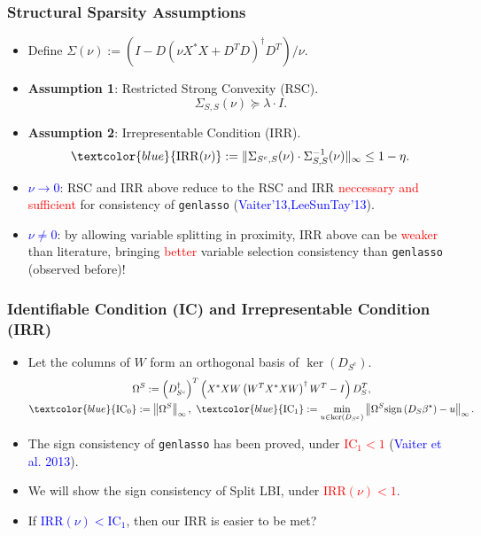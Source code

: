 \documentclass[slidestop,compress,9pt,epsfig,color]{beamer}
\theoremstyle{example}
\begin{document}
\begin{frame}
    \frametitle{Structural Sparsity Assumptions}
    \begin{itemize}
        \item
            Define $\Sigma(\nu) := (I - D (\nu X^{*} X + D^T D)^{\dag} D^T) / \nu$.
        \item
            \textbf{Assumption 1}: Restricted Strong Convexity (RSC).
            \begin{equation}
                \label{eq:sc}
                \Sigma_{S,S}(\nu) \succeq \lambda \cdot I.
            \end{equation}
        \item
            \textbf{Assumption 2}: Irrepresentable Condition (IRR).
            \begin{equation}
                \label{eq:ic}
                \textcolor{blue}{\mathrm{IRR}(\nu)} := \| \Sigma_{S^c, S}(\nu) \cdot \Sigma_{S,S}^{-1}(\nu) \|_{\infty} \le 1 - \eta.
            \end{equation}
         \item
            \textcolor{blue}{$\nu \rightarrow 0$}: RSC and IRR above reduce to the RSC and IRR \textcolor{red}{neccessary and sufficient} for consistency of \texttt{genlasso} (\textcolor{blue}{Vaiter'13,LeeSunTay'13}).
        \item
            \textcolor{blue}{$\nu \neq 0$}: by allowing variable splitting in proximity, IRR above can be \textcolor{red}{weaker} than literature, bringing \textcolor{red}{better} variable selection consistency than \texttt{genlasso} (observed before)!
    \end{itemize}
\end{frame}

\begin{frame}
    \frametitle{Identifiable Condition (IC) and Irrepresentable Condition (IRR)}
    \begin{itemize}
        \item
            Let the columns of $W$ form an orthogonal basis of $\ker(D_{S^c})$.
            \begin{gather}
                \Omega^S := \left( D_{S^c}^{\dag} \right)^T \left( X^{*} X W \left( W^T X^{*} X W \right)^{\dag} W^T - I \right) D_S^T,\\
                \textcolor{blue}{\mathrm{IC}_0} := \left\| \Omega^S \right\|_{\infty},\ \textcolor{blue}{\mathrm{IC}_1} := \min_{u\in \ker(D_{S^c})} \left\| \Omega^S \mathrm{sign} \left( D_S \beta^{\star} \right) - u \right\|_{\infty}.
            \end{gather}
        \item
            The sign consistency of \texttt{genlasso} has been proved, under \textcolor{red}{$\mathrm{IC}_1 < 1$} (\textcolor{blue}{Vaiter et al. 2013}).
        \item
            We will show the sign consistency of Split LBI, under \textcolor{red}{$\mathrm{IRR}(\nu) < 1$}.
        \item
            If \textcolor{blue}{$\mathrm{IRR}(\nu) < \mathrm{IC}_1$}, then our IRR is easier to be met?
    \end{itemize}
\end{frame}
\end{document}
